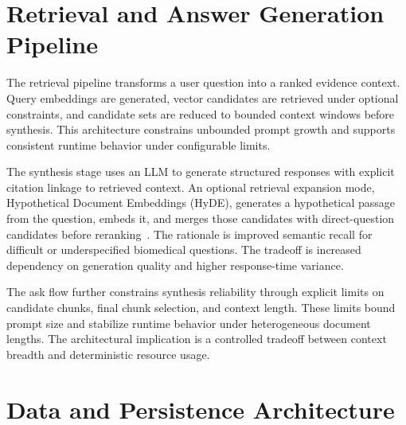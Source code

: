 \section{Retrieval and Answer Generation Pipeline}

The retrieval pipeline transforms a user question into a ranked evidence context. Query embeddings are generated, vector candidates are retrieved under optional constraints, and candidate sets are reduced to bounded context windows before synthesis. This architecture constrains unbounded prompt growth and supports consistent runtime behavior under configurable limits.

The synthesis stage uses an LLM to generate structured responses with explicit citation linkage to retrieved context. An optional retrieval expansion mode, Hypothetical Document Embeddings (HyDE), generates a hypothetical passage from the question, embeds it, and merges those candidates with direct-question candidates before reranking~\cite{gao2023hyde}. The rationale is improved semantic recall for difficult or underspecified biomedical questions. The tradeoff is increased dependency on generation quality and higher response-time variance.

The ask flow further constrains synthesis reliability through explicit limits on candidate chunks, final chunk selection, and context length. These limits bound prompt size and stabilize runtime behavior under heterogeneous document lengths. The architectural implication is a controlled tradeoff between context breadth and deterministic resource usage.

\section{Data and Persistence Architecture}

